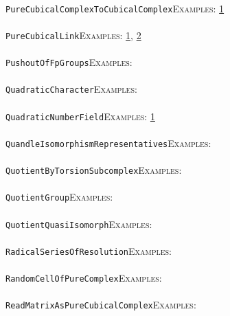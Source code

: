 \documentclass[a4paper,11pt]{report}
\begin{document}
{{ \\
 \texttt{PureCubicalComplexToCubicalComplex}{\nobreakspace}{\nobreakspace}{\nobreakspace}{\nobreakspace}\textsc{Examples:} \href{../www/SideLinks/About/aboutCubical.html} {1}{\nobreakspace} \\
 \\
 \texttt{PureCubicalLink}{\nobreakspace}{\nobreakspace}{\nobreakspace}{\nobreakspace}\textsc{Examples:} \href{tutorial/chap3.html} {1}{\nobreakspace}, \href{../www/SideLinks/About/aboutCoverinSpaces.html} {2}{\nobreakspace} \\
 \\
 \texttt{PushoutOfFpGroups}{\nobreakspace}{\nobreakspace}{\nobreakspace}{\nobreakspace}\textsc{Examples:} \\
 \\
 \texttt{QuadraticCharacter}{\nobreakspace}{\nobreakspace}{\nobreakspace}{\nobreakspace}\textsc{Examples:} \\
 \\
 \texttt{QuadraticNumberField}{\nobreakspace}{\nobreakspace}{\nobreakspace}{\nobreakspace}\textsc{Examples:} \href{tutorial/chap10.html} {1}{\nobreakspace} \\
 \\
 \texttt{QuandleIsomorphismRepresentatives}{\nobreakspace}{\nobreakspace}{\nobreakspace}{\nobreakspace}\textsc{Examples:} \\
 \\
 \texttt{QuotientByTorsionSubcomplex}{\nobreakspace}{\nobreakspace}{\nobreakspace}{\nobreakspace}\textsc{Examples:} \\
 \\
 \texttt{QuotientGroup}{\nobreakspace}{\nobreakspace}{\nobreakspace}{\nobreakspace}\textsc{Examples:} \\
 \\
 \texttt{QuotientQuasiIsomorph}{\nobreakspace}{\nobreakspace}{\nobreakspace}{\nobreakspace}\textsc{Examples:} \\
 \\
 \texttt{RadicalSeriesOfResolution}{\nobreakspace}{\nobreakspace}{\nobreakspace}{\nobreakspace}\textsc{Examples:} \\
 \\
 \texttt{RandomCellOfPureComplex}{\nobreakspace}{\nobreakspace}{\nobreakspace}{\nobreakspace}\textsc{Examples:} \\
 \\
 \texttt{ReadMatrixAsPureCubicalComplex}{\nobreakspace}{\nobreakspace}{\nobreakspace}{\nobreakspace}\textsc{Examples:} \\
}}
\end{document}
